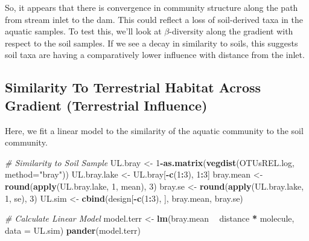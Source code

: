 \documentclass[]{article}
\newenvironment{Shaded}{\begin{snugshade}}{\end{snugshade}}
\newcommand{\KeywordTok}[1]{\textcolor[rgb]{0.13,0.29,0.53}{\textbf{#1}}}
\newcommand{\DataTypeTok}[1]{\textcolor[rgb]{0.13,0.29,0.53}{#1}}
\newcommand{\DecValTok}[1]{\textcolor[rgb]{0.00,0.00,0.81}{#1}}
\newcommand{\StringTok}[1]{\textcolor[rgb]{0.31,0.60,0.02}{#1}}
\newcommand{\CommentTok}[1]{\textcolor[rgb]{0.56,0.35,0.01}{\textit{#1}}}
\newcommand{\OperatorTok}[1]{\textcolor[rgb]{0.81,0.36,0.00}{\textbf{#1}}}
\newcommand{\NormalTok}[1]{#1}
\begin{document}
So, it appears that there is convergence in community structure along
the path from stream inlet to the dam. This could reflect a loss of
soil-derived taxa in the aquatic samples. To test this, we'll look at
\(\beta\)-diversity along the gradient with respect to the soil samples.
If we see a decay in similarity to soils, this suggests soil taxa are
having a comparatively lower influence with distance from the inlet.

\subsection{Similarity To Terrestrial Habitat Across Gradient
(Terrestrial
Influence)}\label{similarity-to-terrestrial-habitat-across-gradient-terrestrial-influence}

Here, we fit a linear model to the similarity of the aquatic community
to the soil community.

\begin{Shaded}
\begin{Highlighting}[]
\CommentTok{# Similarity to Soil Sample}
\NormalTok{UL.bray      <-}\StringTok{ }\DecValTok{1}\OperatorTok{-}\KeywordTok{as.matrix}\NormalTok{(}\KeywordTok{vegdist}\NormalTok{(OTUsREL.log, }\DataTypeTok{method=}\StringTok{"bray"}\NormalTok{))}
\NormalTok{UL.bray.lake <-}\StringTok{ }\NormalTok{UL.bray[}\OperatorTok{-}\KeywordTok{c}\NormalTok{(}\DecValTok{1}\OperatorTok{:}\DecValTok{3}\NormalTok{), }\DecValTok{1}\OperatorTok{:}\DecValTok{3}\NormalTok{] }
\NormalTok{bray.mean    <-}\StringTok{ }\KeywordTok{round}\NormalTok{(}\KeywordTok{apply}\NormalTok{(UL.bray.lake, }\DecValTok{1}\NormalTok{, mean), }\DecValTok{3}\NormalTok{)}
\NormalTok{bray.se      <-}\StringTok{ }\KeywordTok{round}\NormalTok{(}\KeywordTok{apply}\NormalTok{(UL.bray.lake, }\DecValTok{1}\NormalTok{, se), }\DecValTok{3}\NormalTok{)}
\NormalTok{UL.sim       <-}\StringTok{ }\KeywordTok{cbind}\NormalTok{(design[}\OperatorTok{-}\KeywordTok{c}\NormalTok{(}\DecValTok{1}\OperatorTok{:}\DecValTok{3}\NormalTok{), ], bray.mean, bray.se)}

\CommentTok{# Calculate Linear Model}
\NormalTok{model.terr <-}\StringTok{ }\KeywordTok{lm}\NormalTok{(bray.mean }\OperatorTok{~}\StringTok{ }\NormalTok{distance }\OperatorTok{*}\StringTok{ }\NormalTok{molecule, }\DataTypeTok{data =}\NormalTok{ UL.sim)}
\KeywordTok{pander}\NormalTok{(model.terr)}
\end{Highlighting}
\end{Shaded}
\end{document}
